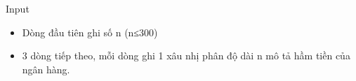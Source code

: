 Input
\begin{itemize}
	\item     Dòng đầu tiên ghi số n (n≤300)   
	\item     3 dòng tiếp theo, mỗi dòng ghi 1 xâu nhị phân độ dài n mô tả hầm tiền của ngân hàng.   
\end{itemize}